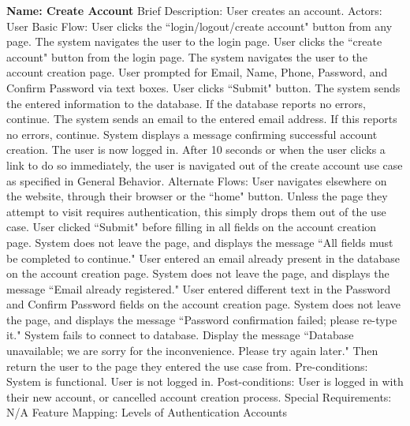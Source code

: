 \begin{outline}[enumerate]
\1 {\bf Name: Create Account}
\2 Brief Description: User creates an account.
\2 Actors: User
\2 Basic Flow:
\3 User clicks the ``login/logout/create account" button from any page.
\3 The system navigates the user to the login page.
\3 User clicks the ``create account" button from the login page.
\3 The system navigates the user to the account creation page.
\3 User prompted for Email, Name, Phone, Password, and Confirm Password via text boxes.
\3 User clicks ``Submit" button.
\3 The system sends the entered information to the database.  If the database reports no errors, continue.
\3 The system sends an email to the entered email address.  If this reports no errors, continue.
\3 System displays a message confirming successful account creation.  The user is now logged in.
\3 After 10 seconds or when the user clicks a link to do so immediately, the user is navigated out of the create account use case as specified in General Behavior.
\2 Alternate Flows:
\3 User navigates elsewhere on the website, through their browser or the ``home" button.  Unless the page they attempt to visit requires authentication, this simply drops them out of the use case.
\3 User clicked ``Submit" before filling in all fields on the account creation page.  System does not leave the page, and displays the message ``All fields must be completed to continue."
\3 User entered an email already present in the database on the account creation page.  System does not leave the page, and displays the message ``Email already registered."
\3 User entered different text in the Password and Confirm Password fields on the account creation page.  System does not leave the page, and displays the message ``Password confirmation failed; please re-type it."
\3 System fails to connect to database.  Display the message ``Database unavailable; we are sorry for the inconvenience.  Please try again later."  Then return the user to the page they entered the use case from.
\2 Pre-conditions:
\3 System is functional.
\3 User is not logged in.
\2 Post-conditions:
\3 User is logged in with their new account, or cancelled account creation process.
\2 Special Requirements:
\3 N/A
\2 Feature Mapping:
\3 Levels of Authentication
\3 Accounts

\end{outline}

